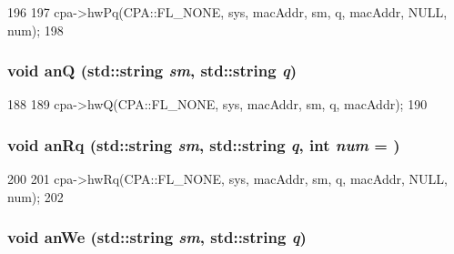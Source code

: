 \begin{DoxyCode}
196                                                       {
197         cpa->hwPq(CPA::FL_NONE, sys, macAddr, sm, q, macAddr, NULL, num);
198     }
\end{DoxyCode}
\hypertarget{classIGbE_ad5560d7f7671ea0c96250beacf187ac8}{
\subsubsection[{anQ}]{\setlength{\rightskip}{0pt plus 5cm}void anQ (std::string {\em sm}, \/  std::string {\em q})}}
\label{classIGbE_ad5560d7f7671ea0c96250beacf187ac8}



\begin{DoxyCode}
188                                         { 
189         cpa->hwQ(CPA::FL_NONE, sys, macAddr, sm, q, macAddr);
190     }
\end{DoxyCode}
\hypertarget{classIGbE_a48fd12dd7cf4b842162b7a0b89875559}{
\subsubsection[{anRq}]{\setlength{\rightskip}{0pt plus 5cm}void anRq (std::string {\em sm}, \/  std::string {\em q}, \/  int {\em num} = {})}}
\label{classIGbE_a48fd12dd7cf4b842162b7a0b89875559}



\begin{DoxyCode}
200                                                       {
201         cpa->hwRq(CPA::FL_NONE, sys, macAddr, sm, q, macAddr, NULL, num);
202     }
\end{DoxyCode}
\hypertarget{classIGbE_ace79fee3c0fd652014ae35a7b1497ca1}{
\subsubsection[{anWe}]{\setlength{\rightskip}{0pt plus 5cm}void anWe (std::string {\em sm}, \/  std::string {\em q})}}
\label{classIGbE_ace79fee3c0fd652014ae35a7b1497ca1}



